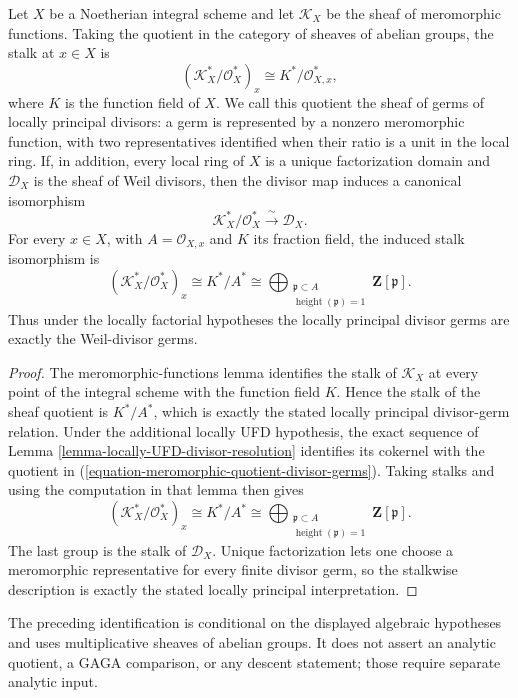 \begin{lemma}
\label{lemma-meromorphic-quotient-divisor-germs}
\begin{reference}
\cite[Chapter III, \S 3.4, p. 160]{Tohoku}
\end{reference}
Let $X$ be a Noetherian integral scheme and let $\mathcal{K}_X$ be the
sheaf of meromorphic functions. Taking the quotient in the category of
sheaves of abelian groups, the stalk at $x \in X$ is
\[
(\mathcal{K}_X^*/\mathcal{O}_X^*)_x
\cong K^*/\mathcal{O}_{X,x}^*,
\]
where $K$ is the function field of $X$. We call this quotient the sheaf of
germs of locally principal divisors: a germ is represented by a nonzero
meromorphic function, with two representatives identified when their ratio
is a unit in the local ring. If, in addition, every local ring of $X$ is a
unique factorization domain and $\mathcal{D}_X$ is the sheaf of Weil
divisors, then the divisor map induces a canonical isomorphism
\begin{equation}
\label{equation-meromorphic-quotient-divisor-germs}
\mathcal{K}_X^*/\mathcal{O}_X^*
\xrightarrow{\ \sim\ }
\mathcal{D}_X.
\end{equation}
For every $x \in X$, with $A = \mathcal{O}_{X,x}$ and $K$ its fraction
field, the induced stalk isomorphism is
\[
(\mathcal{K}_X^*/\mathcal{O}_X^*)_x
\cong K^*/A^*
\cong
\bigoplus_{\substack{\mathfrak p \subset A\\
\operatorname{height}(\mathfrak p)=1}}
\mathbf Z[\mathfrak p].
\]
Thus under the locally factorial hypotheses the locally principal divisor
germs are exactly the Weil-divisor germs.
\end{lemma}

\begin{proof}
The meromorphic-functions lemma identifies the stalk of $\mathcal{K}_X$ at
every point of the integral scheme with the function field $K$. Hence the
stalk of the sheaf quotient is $K^*/A^*$, which is exactly the stated
locally principal divisor-germ relation. Under the additional locally UFD
hypothesis, the exact sequence of Lemma
\ref{lemma-locally-UFD-divisor-resolution} identifies its cokernel with
the quotient in (\ref{equation-meromorphic-quotient-divisor-germs}).
Taking stalks and using the computation in that lemma then gives
\[
(\mathcal{K}_X^*/\mathcal{O}_X^*)_x \cong K^*/A^*
\cong
\bigoplus_{\substack{\mathfrak p \subset A\\
\operatorname{height}(\mathfrak p)=1}}
\mathbf Z[\mathfrak p].
\]
The last group is the stalk of $\mathcal{D}_X$. Unique factorization lets
one choose a meromorphic representative for every finite divisor germ, so
the stalkwise description is exactly the stated locally principal
interpretation.
\end{proof}

\begin{remark}
\label{remark-meromorphic-quotient-algebraic-boundary}
The preceding identification is conditional on the displayed algebraic
hypotheses and uses multiplicative sheaves of abelian groups. It does not
assert an analytic quotient, a GAGA comparison, or any descent statement;
those require separate analytic input.
\end{remark}

